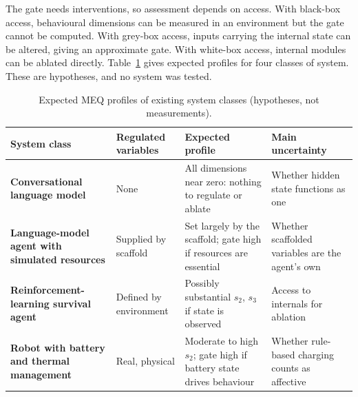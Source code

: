 \documentclass[twoside,11pt]{article}
\begin{document}
The gate needs interventions, so assessment depends on access. With black-box access, behavioural dimensions can be measured in an environment but the gate cannot be computed. With grey-box access, inputs carrying the internal state can be altered, giving an approximate gate. With white-box access, internal modules can be ablated directly. Table~\ref{tab:8} gives expected profiles for four classes of system. These are hypotheses, and no system was tested.

\begin{table}[!htbp]
\centering
\caption{Expected MEQ profiles of existing system classes (hypotheses, not measurements).}\label{tab:8}
\footnotesize
\renewcommand{\arraystretch}{1.2}
\begin{tabular}{>{\raggedright\arraybackslash}p{\dimexpr 0.2548\dimexpr\textwidth-8\tabcolsep\relax\relax}>{\raggedright\arraybackslash}p{\dimexpr 0.2105\dimexpr\textwidth-8\tabcolsep\relax\relax}>{\raggedright\arraybackslash}p{\dimexpr 0.3324\dimexpr\textwidth-8\tabcolsep\relax\relax}>{\raggedright\arraybackslash}p{\dimexpr 0.2023\dimexpr\textwidth-8\tabcolsep\relax\relax}}
\toprule
\textbf{System class} & \textbf{Regulated variables} & \textbf{Expected profile} & \textbf{Main uncertainty} \\
\midrule
\textbf{Conversational language model} & None & All dimensions near zero: nothing to regulate or ablate & Whether hidden state functions as one \\
\textbf{Language-model agent with simulated resources} & Supplied by scaffold & Set largely by the scaffold; gate high if resources are essential & Whether scaffolded variables are the agent's own \\
\textbf{Reinforcement-learning survival agent} & Defined by environment & Possibly substantial $s_{2}$, $s_{3}$ if state is observed & Access to internals for ablation \\
\textbf{Robot with battery and thermal management} & Real, physical & Moderate to high $s_{2}$; gate high if battery state drives behaviour & Whether rule-based charging counts as affective \\
\bottomrule
\end{tabular}
\par{}
\end{table}
\end{document}
